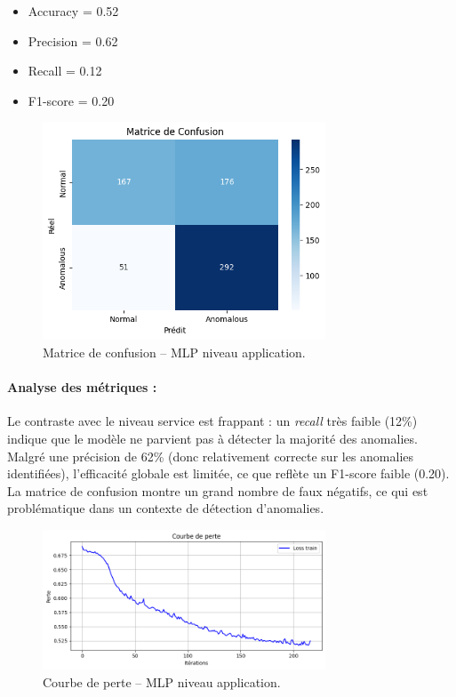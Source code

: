 \documentclass[a4paper,12pt]{report}
\begin{document}
\begin{itemize}
    \item Accuracy = 0.52
    \item Precision = 0.62
    \item Recall = 0.12
    \item F1-score = 0.20
\end{itemize}

\begin{figure}[H]
    \centering
    \includegraphics[width=0.75\textwidth]{images/confusion_matrix_mlp_application.png}
    \caption{Matrice de confusion – MLP niveau application.}
\end{figure}

\paragraph{Analyse des métriques :}
Le contraste avec le niveau service est frappant : un \textit{recall} très faible (12\%) indique que le modèle ne parvient pas à détecter la majorité des anomalies. Malgré une précision de 62\% (donc relativement correcte sur les anomalies identifiées), l’efficacité globale est limitée, ce que reflète un F1-score faible (0.20). La matrice de confusion montre un grand nombre de faux négatifs, ce qui est problématique dans un contexte de détection d’anomalies.

\begin{figure}[H]
    \centering
    \includegraphics[width=0.75\textwidth]{images/loss_curve_mlp_application.png}
    \caption{Courbe de perte – MLP niveau application.}
\end{figure}
\end{document}
